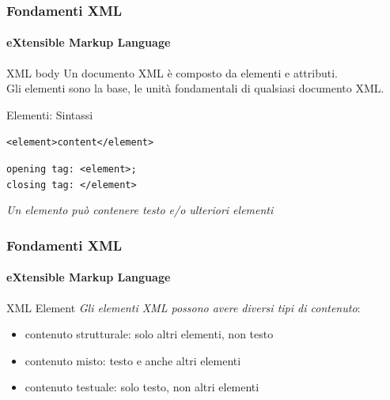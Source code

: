\begin{frame}
    \frametitle{Fondamenti XML}
    \framesubtitle{eXtensible Markup Language}
    \addtocounter{nframe}{1}

	\begin{block}{XML body}
		Un documento XML è composto da elementi e attributi. 
	   \\ Gli elementi sono la base, le unità fondamentali di qualsiasi documento XML.
    \end{block}

    \begin{block}{Elementi: Sintassi}
    \begin{center}\texttt{<element>content</element>}\end{center}
    \begin{center}\texttt{opening tag: <element>;\\ closing tag: </element>}\end{center}
	\end{block}
	\begin{tiny}
		\textit{Un elemento può contenere testo e/o ulteriori elementi}
	\end{tiny}
	
\end{frame}

\begin{frame}
    \frametitle{Fondamenti XML}
    \framesubtitle{eXtensible Markup Language}
    \addtocounter{nframe}{1}

	\begin{block}{XML Element}
		\textit{Gli elementi XML possono avere diversi tipi di contenuto}:
		\begin{itemize}
			\item contenuto strutturale: solo altri elementi, non testo
			\item contenuto misto: testo e anche altri elementi
			\item contenuto testuale: solo testo, non altri elementi
		\end{itemize}
	\end{block}
	
\end{frame}

